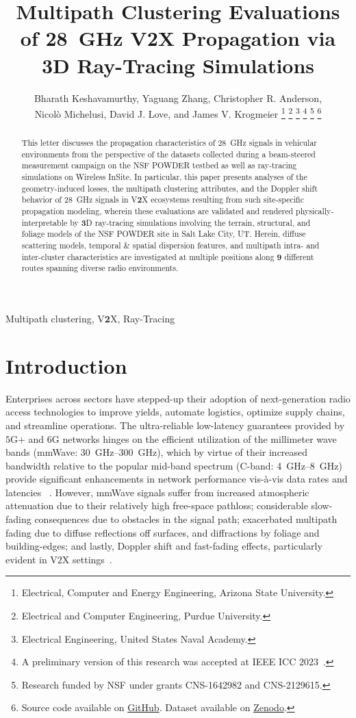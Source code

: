 \documentclass[10pt, twocolumn]{IEEEtran}
\title{Multipath Clustering Evaluations of \SI{28}{\giga\hertz} V2X Propagation via 3D Ray-Tracing Simulations}
\author{Bharath Keshavamurthy\IEEEauthorrefmark{1}, Yaguang Zhang\IEEEauthorrefmark{2}, Christopher R. Anderson\IEEEauthorrefmark{3},\\Nicol\`{o} Michelusi\IEEEauthorrefmark{1}, David J. Love\IEEEauthorrefmark{2}, and James V. Krogmeier\IEEEauthorrefmark{2}
\thanks{\IEEEauthorrefmark{1}Electrical, Computer and Energy Engineering, Arizona State University.}
\thanks{\IEEEauthorrefmark{2}Electrical and Computer Engineering, Purdue University.}
\thanks{\IEEEauthorrefmark{3}Electrical Engineering, United States Naval Academy.}
\thanks{A preliminary version of this research was accepted at IEEE ICC $2023$~\cite{SPAVE_ICC}.}
\thanks{Research funded by NSF under grants CNS-1642982 and CNS-2129615.}
\thanks{Source code available on \href{https://github.com/bharathkeshavamurthy/SPAVE-28G.git}{GitHub}\cite{SPAVE_Source_Code}. Dataset available on \href{https://doi.org/10.5281/zenodo.7178597}{Zenodo}\cite{SPAVE_Dataset}.}
\vspace{-12mm}
}
\begin{document}

\maketitle
\thispagestyle{empty}
\pagestyle{empty}
\vspace{-12mm}

\begin{abstract}
This letter discusses the propagation characteristics of \SI{28}{\giga\hertz} signals in vehicular environments from the perspective of the datasets collected during a beam-steered measurement campaign on the NSF POWDER testbed as well as ray-tracing simulations on Wireless InSite. In particular, this paper presents analyses of the geometry-induced losses, the multipath clustering attributes, and the Doppler shift behavior of \SI{28}{\giga\hertz} signals in V$\mathbf{2}$X ecosystems resulting from such site-specific propagation modeling, wherein these evaluations are validated and rendered physically-interpretable by $\mathbf{3}$D ray-tracing simulations involving the terrain, structural, and foliage models of the NSF POWDER site in Salt Lake City, UT. Herein, diffuse scattering models, temporal \& spatial dispersion features, and multipath intra- and inter-cluster characteristics are investigated at multiple positions along $\mathbf{9}$ different routes spanning diverse radio environments.
\end{abstract}

\begin{IEEEkeywords}
    Multipath clustering, V$\mathbf{2}$X, Ray-Tracing
\end{IEEEkeywords}
\vspace{-3mm}

\section{Introduction}\label{S1}
Enterprises across sectors have stepped-up their adoption of next-generation radio access technologies to improve yields, automate logistics, optimize supply chains, and streamline operations. The ultra-reliable low-latency guarantees provided by $5$G$+$ and $6$G networks hinges on the efficient utilization of the millimeter wave bands (mmWave: \SIrange{30}{300}{\giga\hertz}), which by virtue of their increased bandwidth relative to the popular mid-band spectrum (C-band: \SIrange{4}{8}{\giga\hertz}) provide significant enhancements in network performance vis-\`{a}-vis data rates and latencies ~\cite{mmWaveSurvey}. However, mmWave signals suffer from increased atmospheric attenuation due to their relatively high free-space pathloss; considerable slow-fading consequences due to obstacles in the signal path; exacerbated multipath fading due to diffuse reflections off surfaces, and diffractions by foliage and building-edges; and lastly, Doppler shift and fast-fading effects, particularly evident in V$2$X settings~\cite{Rappaport}.
\end{document}
